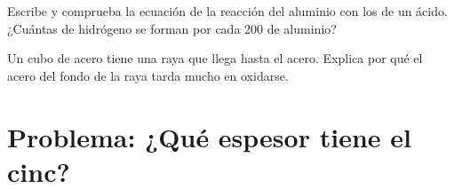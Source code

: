 \begin{exercise}[$\star\star\star$]\label{exo:g9:metals-acids-corrosion:11}
Escribe y comprueba la ecuación de la reacción del aluminio con los
  de un ácido. ¿Cuántas  de hidrógeno se forman por
cada 200  de aluminio?
\end{exercise}

\begin{exercise}[$\star\star\star$]\label{exo:g9:metals-acids-corrosion:12}
Un cubo de acero  tiene una raya que llega hasta el acero.
Explica por qué el acero del fondo de la raya tarda mucho en oxidarse.
\end{exercise}

\section{Problema: ¿Qué espesor tiene el cinc?}

